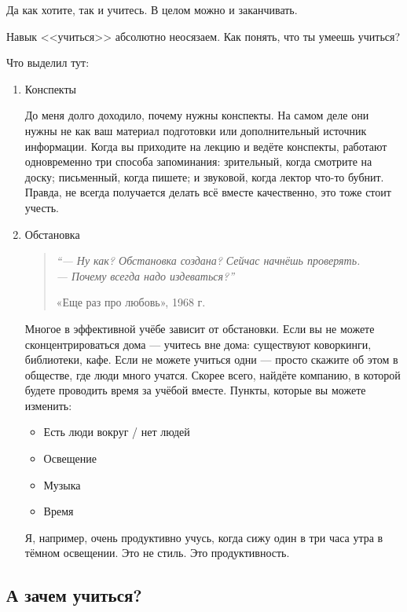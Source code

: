\documentclass[12pt, a4paper]{article}
\begin{document}
Да как хотите, так и учитесь. В целом можно и заканчивать.

Навык <<учиться>> абсолютно неосязаем. Как понять, что ты умеешь учиться? 

Что выделил тут:

\begin{enumerate}
    \item Конспекты
    
    До меня долго доходило, почему нужны конспекты. На самом деле они нужны не как ваш материал подготовки или дополнительный источник информации. Когда вы приходите на лекцию и ведёте конспекты, работают одновременно три способа запоминания: зрительный, когда смотрите на доску; письменный, когда пишете; и звуковой, когда лектор что-то бубнит. Правда, не всегда получается делать всё вместе качественно, это тоже стоит учесть.
    
    \item Обстановка
    
\begin{quote}
\itshape
\enquote{— Ну как? Обстановка создана? Сейчас начнёшь проверять. \\ — Почему всегда надо издеваться?}

\raggedleft
\textnormal{«Еще раз про любовь», 1968 г.}
\end{quote}

    Многое в эффективной учёбе зависит от обстановки. Если вы не можете сконцентрироваться дома --- учитесь вне дома: существуют коворкинги, библиотеки, кафе. Если не можете учиться одни --- просто скажите об этом в обществе, где люди много учатся. Скорее всего, найдёте компанию, в которой будете проводить время за учёбой вместе. Пункты, которые вы можете изменить:
    \begin{itemize}
        \item Есть люди вокруг / нет людей
        \item Освещение
        \item Музыка
        \item Время
    \end{itemize}
    Я, например, очень продуктивно учусь, когда сижу один в три часа утра в тёмном освещении. Это не стиль. Это продуктивность. 
\end{enumerate}

\subsection{А зачем учиться?}
\end{document}
